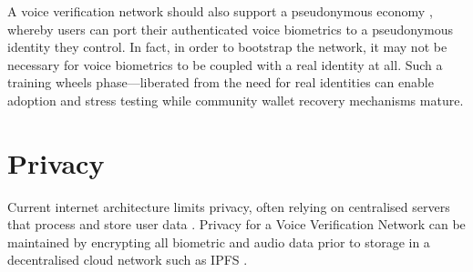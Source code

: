 \documentclass[11pt,a4paper]{article}
\begin{document}
A voice verification network should also support a pseudonymous economy \cite{srinivasan2021psuedonymouseconomy}, whereby users can port their authenticated voice biometrics to a pseudonymous identity they control.
In fact, in order to bootstrap the network, it may not be necessary for voice biometrics to be coupled with a real identity at all.
Such a \textquotesingle training wheels\textquotesingle{} phase---liberated from the need for real identities can enable adoption and stress testing while community wallet recovery mechanisms mature.

\section{Privacy}
\label{sec:results}
Current internet architecture limits privacy, often relying on centralised servers that process and store user data \cite{wang2021cogoverned}.
Privacy for a Voice Verification Network can be maintained by encrypting all biometric and audio data prior to storage in a decentralised cloud network such as IPFS \cite{ipfs2023interplanetary}.
\end{document}
